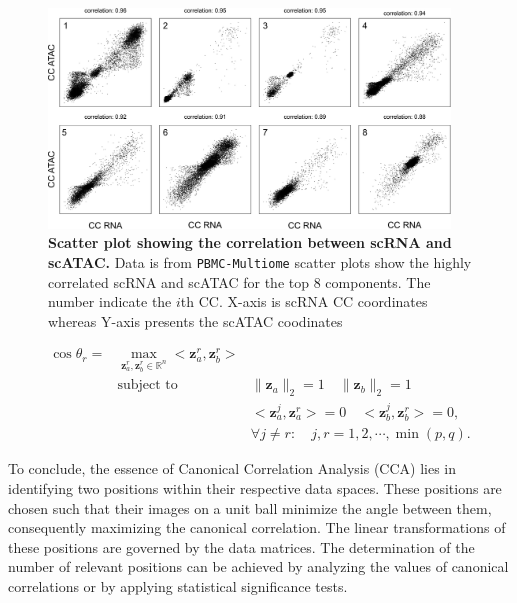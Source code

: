 \begin{figure}[!ht]
	\centering
	\includegraphics[width=0.95\textwidth]{CC_corrlation_scatter/fig}
	\vspace{0.1cm}
	\caption[Scatter plot showing the correlation between scRNA and scATAC.]{\textbf{Scatter plot showing the correlation between scRNA and scATAC.} Data is from \texttt{PBMC-Multiome} scatter plots show the highly correlated scRNA and scATAC for the top 8 components. The number indicate the $i$th CC. X-axis is scRNA CC coordinates whereas Y-axis presents the scATAC coodinates}
	\label{fig:CC_corrlation_scatter}
\end{figure}

\begin{equation}
\begin{aligned}
\cos \theta_r = &\underset{{\mathbf z}_a^r, {\mathbf z}_b^r \in\mathbb{R}^n}{\max}<{\mathbf z}_a^r, {\mathbf z}_b^r>\\
                &\text{subject to  } & \|{\mathbf z}_a\|_2=1\quad \|{\mathbf z}_b\|_2=1\\
				  & & <{\mathbf z}_a^j, {\mathbf z}_a^r>=0\quad <{\mathbf z}_b^j, {\mathbf z}_b^r>=0,\\
				  & & \forall j \neq r: \quad j,r = 1,2,\cdots,\min(p,q).
\end{aligned}
\end{equation}

 To conclude, the essence of Canonical Correlation Analysis (CCA) lies in identifying two positions within their respective data spaces. These positions are chosen such that their images on a unit ball minimize the angle between them, consequently maximizing the canonical correlation. The linear transformations of these positions are governed by the data matrices. The determination of the number of relevant positions can be achieved by analyzing the values of canonical correlations or by applying statistical significance tests.

